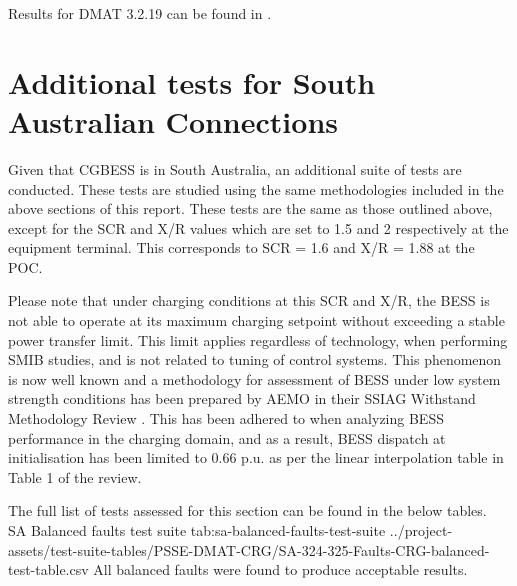 \documentclass{../grid-link-report}
\newcommand{\projectassetsdir}{../project-assets}
\begin{document}
	Results for DMAT 3.2.19 can be found in .
	
	\section{Additional tests for South Australian Connections}
	
	Given that \ac{CGBESS} is in South Australia, an additional suite of tests are conducted. These tests are studied using the same methodologies included in the above sections of this report. These tests are the same as those outlined above, except for the \ac{SCR} and X/R values which are set to 1.5 and 2 respectively at the equipment terminal. This corresponds to SCR = 1.6 and X/R = 1.88 at the POC. 

	Please note that under charging conditions at this SCR and X/R, the BESS is not able to operate at its maximum charging setpoint without exceeding a stable power transfer limit. This limit applies regardless of technology, when performing SMIB studies, and is not related to tuning of control systems. This phenomenon is now well known and a methodology for assessment of BESS under low system strength conditions has been prepared by AEMO in their SSIAG Withstand Methodology Review \cite{aemo-SCR}. This has been adhered to when analyzing BESS performance in the charging domain, and as a result, BESS dispatch at initialisation has been limited to 0.66 p.u. as per the linear interpolation table in Table 1 of the review.
	
	The full list of tests assessed for this section can be found in the below tables. \\
	
	{
		\fontsize{6}{8}\selectfont
		\autoscaledlongtable
		{SA Balanced faults test suite}
		{tab:sa-balanced-faults-test-suite}
		{\projectassetsdir/test-suite-tables/PSSE-DMAT-CRG/SA-324-325-Faults-CRG-balanced-test-table.csv}
	}
	All balanced faults were found to produce acceptable results.
	
\end{document}
